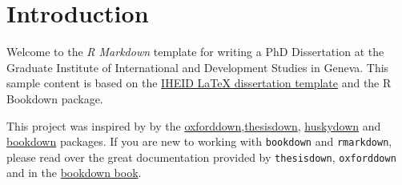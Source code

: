 \documentclass{iheid}
\newcommand*{\bibtitle}{References}
\begin{document}
\flushbottom

\hypertarget{introduction}{%
\section*{Introduction}\label{introduction}}

Welcome to the \emph{R Markdown} template for writing a PhD Dissertation
at the Graduate Institute of International and Development Studies in
Geneva. This sample content is based on the
\href{https://github.com/jhollway/iheidmytex}{IHEID LaTeX dissertation
template} and the R Bookdown package.

This project was inspired by by the
\href{https://github.com/ulyngs/oxforddown}{oxforddown},\href{https://github.com/ismayc/thesisdown}{thesisdown},
\href{https://github.com/benmarwick/huskydown}{huskydown} and
\href{https://github.com/rstudio/bookdown}{bookdown} packages. If you
are new to working with \texttt{bookdown} and \texttt{rmarkdown}, please
read over the great documentation provided by \texttt{thesisdown},
\texttt{oxforddown} and in the
\href{https://bookdown.org/yihui/bookdown/}{bookdown book}.


\setlength{\baselineskip}{0pt} %

{\renewcommand*\MakeUppercase[1]{#1}%
\printbibliography[heading=bibintoc,title={\bibtitle}]}

\end{document}
